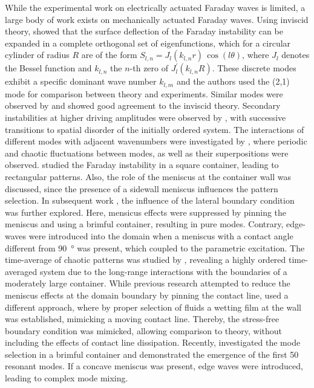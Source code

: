 \documentclass{jfm_arxiv}
\begin{document}
While the experimental work on electrically actuated Faraday waves is limited, a large body of work exists on mechanically actuated Faraday waves.
Using inviscid theory, \citet{Benjamin1954} showed that the surface deflection of the Faraday instability can be expanded in a complete orthogonal set of eigenfunctions, which for a circular cylinder of radius $R$ are of the form $S_{l,n} = J_l ( k_{l,n} r ) \, \cos ( l \theta )$, where $J_l$ denotes the Bessel function and $k_{l,n}$ the $n$-th zero of $J^\prime_l (k_{l,n} R )$. These discrete modes exhibit a specific dominant wave number $k_{l,m}$ and the authors used the (2,1) mode for comparison between theory and experiments. Similar modes were observed by \citet{Dodge1965} and showed good agreement to the inviscid theory.
Secondary instabilities at higher driving amplitudes were observed by \citet{Gollub1983}, with successive transitions to spatial disorder of the initially ordered system.
The interactions of different modes with adjacent wavenumbers were investigated by \citet{Ciliberto1984}, where periodic and chaotic fluctuations between modes, as well as their superpositions were observed.
\citet{Douady1988} studied the Faraday instability in a square container, leading to rectangular patterns. Also, the role of the meniscus at the container wall was discussed, since the presence of a sidewall meniscus influences the pattern selection.
In subsequent work \citep{Douady1990}, the influence of the lateral boundary condition was further explored. Here, mensicus effects were suppressed by pinning the meniscus and using a brimful container, resulting in pure modes. Contrary, edge-waves were introduced into the domain when a meniscus with a contact angle different from \SI{90}{\degree} was present, which coupled to the parametric excitation.
The time-average of chaotic patterns was studied by \citet{Gluckman1993}, revealing a highly ordered time-averaged system due to the long-range interactions with the boundaries of a moderately large container.
While previous research attempted to reduce the meniscus effects at the domain boundary by pinning the contact line, \citet{Batson2013} used a different approach, where by proper selection of fluids a wetting film at the wall was established, mimicking a moving contact line.
Thereby, the stress-free boundary condition was mimicked, allowing comparison to theory, without including the effects of contact line dissipation.
Recently, \citet{Shao2021} investigated the mode selection in a brimful container and demonstrated the emergence of the first 50 resonant modes. If a concave meniscus was present, edge waves were introduced, leading to complex mode mixing. 
\end{document}
